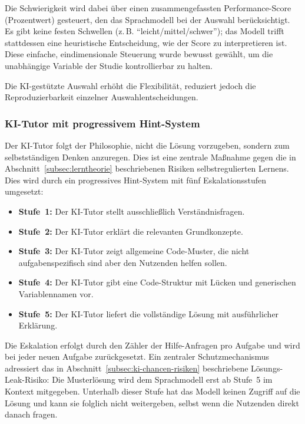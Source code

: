 Die Schwierigkeit wird dabei über einen zusammengefassten Performance-Score (Prozentwert) gesteuert, den das Sprachmodell bei der Auswahl berücksichtigt. Es gibt keine festen Schwellen (z.\,B. \enquote{leicht/mittel/schwer}); das Modell trifft stattdessen eine heuristische Entscheidung, wie der Score zu interpretieren ist. Diese einfache, eindimensionale Steuerung wurde bewusst gewählt, um die unabhängige Variable der Studie kontrollierbar zu halten.

Die KI-gestützte Auswahl erhöht die Flexibilität, reduziert jedoch die Reproduzierbarkeit einzelner Auswahlentscheidungen.

\subsubsection{KI-Tutor mit progressivem Hint-System}\label{subsec:ki-tutor-konzept}

Der KI-Tutor folgt der Philosophie, nicht die Lösung vorzugeben, sondern zum selbstständigen Denken anzuregen. Dies ist eine zentrale Maßnahme gegen die in Abschnitt~\ref{subsec:lerntheorie} beschriebenen Risiken selbstregulierten Lernens.
Dies wird durch ein progressives Hint-System mit fünf Eskalationsstufen umgesetzt:

\begin{itemize}
    \item \textbf{Stufe~1:} Der KI-Tutor stellt ausschließlich Verständnisfragen.
    \item \textbf{Stufe~2:} Der KI-Tutor erklärt die relevanten Grundkonzepte.
    \item \textbf{Stufe~3:} Der KI-Tutor zeigt allgemeine Code-Muster, die nicht aufgabenspezifisch sind aber den Nutzenden helfen sollen.
    \item \textbf{Stufe~4:} Der KI-Tutor gibt eine Code-Struktur mit Lücken und generischen Variablennamen vor.
    \item \textbf{Stufe~5:} Der KI-Tutor liefert die vollständige Lösung mit ausführlicher Erklärung.
\end{itemize}

Die Eskalation erfolgt durch den Zähler der Hilfe-Anfragen pro Aufgabe und wird bei jeder neuen Aufgabe zurückgesetzt.
Ein zentraler Schutzmechanismus adressiert das in Abschnitt~\ref{subsec:ki-chancen-risiken} beschriebene Lösungs-Leak-Risiko: Die Musterlösung wird dem Sprachmodell erst ab Stufe~5 im Kontext mitgegeben.
Unterhalb dieser Stufe hat das Modell keinen Zugriff auf die Lösung und kann sie folglich nicht weitergeben, selbst wenn die Nutzenden direkt danach fragen.

